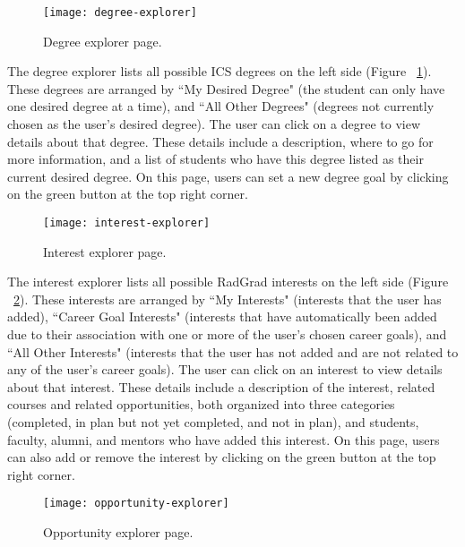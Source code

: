 \begin{figure}[htbp!]
\centering
\texttt{[image: degree-explorer]}
\caption{Degree explorer page.}
\label{degree-explorer}
\end{figure}

The degree explorer lists all possible ICS degrees on the left side (Figure ~\ref{degree-explorer}). These degrees are arranged by ``My Desired Degree" (the student can only have one desired degree at a time), and ``All Other Degrees" (degrees not currently chosen as the user's desired degree). The user can click on a degree to view details about that degree. These details include a description, where to go for more information, and a list of students who have this degree listed as their current desired degree. On this page, users can set a new degree goal by clicking on the green button at the top right corner.

\begin{figure}[htbp!]
\centering
\texttt{[image: interest-explorer]}
\caption{Interest explorer page.}
\label{interest-explorer}
\end{figure}

The interest explorer lists all possible RadGrad interests on the left side (Figure ~\ref{interest-explorer}). These interests are arranged by ``My Interests" (interests that the user has added), ``Career Goal Interests" (interests that have automatically been added due to their association with one or more of the user's chosen career goals), and ``All Other Interests" (interests that the user has not added and are not related to any of the user's career goals). The user can click on an interest to view details about that interest. These details include a description of the interest, related courses and related opportunities, both organized into three categories (completed, in plan but not yet completed, and not in plan), and students, faculty, alumni, and mentors who have added this interest. On this page, users can also add or remove the interest by clicking on the green button at the top right corner.

\begin{figure}[htbp!]
\centering
\texttt{[image: opportunity-explorer]}
\caption{Opportunity explorer page.}
\label{opportunity-explorer}
\end{figure}

